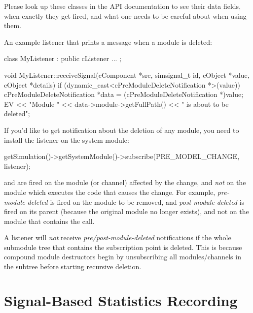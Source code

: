 \begin{note}
  Please look up these classes in the API documentation to see their data fields,
  when exactly they get fired, and what one needs to be careful about when using them.
\end{note}

An example listener that prints a message when a module is deleted:

\begin{cpp}
class MyListener : public cListener
{
   ...
};

void MyListener::receiveSignal(cComponent *src, simsignal_t id, cObject *value,
                               cObject *details)
{
    if (dynamic_cast<cPreModuleDeleteNotification *>(value)) {
        cPreModuleDeleteNotification *data = (cPreModuleDeleteNotification *)value;
        EV << "Module " << data->module->getFullPath() << " is about to be deleted\n";
    }
}
\end{cpp}

If you'd like to get notification about the deletion of any module, you need
to install the listener on the system module:

\begin{cpp}
getSimulation()->getSystemModule()->subscribe(PRE_MODEL_CHANGE, listener);
\end{cpp}

\begin{note}
   and  are fired on the
  module (or channel) affected by the change, and \textit{not} on the module
  which executes the code that causes the change. For example,
  \textit{pre-module-deleted} is fired on the module to be removed, and
  \textit{post-module-deleted} is fired on its parent (because the original
  module no longer exists), and not on the module that contains the
   call.
\end{note}

\begin{note}
  A listener will \textit{not} receive \textit{pre/post-module-deleted}
  notifications if the whole submodule tree that contains the subscription
  point is deleted. This is because compound module destructors begin
  by unsubscribing all modules/channels in the subtree before starting
  recursive deletion.
\end{note}


\section{Signal-Based Statistics Recording}
\label{sec:simple-modules:signal-based-statistics}

